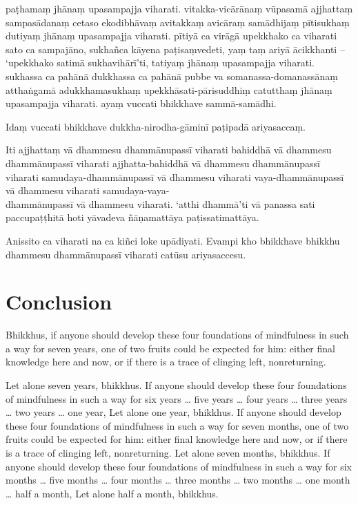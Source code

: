 
\paliPage

paṭhamaṃ jhānaṃ upasampajja viharati. vitakka-vicārānaṃ vūpasamā ajjhattaṃ
sampasādanaṃ cetaso ekodibhāvaṃ avitakkaṃ avicāraṃ samādhijaṃ pītisukhaṃ dutiyaṃ
jhānaṃ upasampajja viharati. pītiyā ca virāgā upekkhako ca viharati sato ca
sampajāno, sukhañca kāyena paṭisaṃvedeti, yaṃ taṃ ariyā ācikkhanti -- ‘upekkhako
satimā sukhavihārī’ti, tatiyaṃ jhānaṃ upasampajja viharati. sukhassa ca pahānā
dukkhassa ca pahānā pubbe va somanassa-domanassānaṃ atthaṅgamā adukkhamasukhaṃ
upekkhāsati-pārisuddhiṃ catutthaṃ jhānaṃ upasampajja viharati. ayaṃ vuccati
bhikkhave sammā-samādhi.

Idaṃ vuccati bhikkhave dukkha-nirodha-gāminī paṭipadā ariyasaccaṃ.

Iti ajjhattaṃ vā dhammesu dhammānupassī viharati bahiddhā vā dhammesu
dhammānupassī viharati ajjhatta-bahiddhā vā dhammesu dhammānupassī viharati
samudaya-dhammānupassī vā dhammesu viharati vaya-dhammānupassī vā dhammesu
viharati samudaya-vaya-\\
dhammānupassī vā dhammesu viharati. `atthi dhammā'ti vā
panassa sati paccupaṭṭhitā hoti yāvadeva ñāṇamattāya paṭissatimattāya.

Anissito ca viharati na ca kiñci loke upādiyati. Evampi kho bhikkhave bhikkhu
dhammesu dhammānupassī viharati catūsu ariyasaccesu.



\englishPage
\chapter{Conclusion}

Bhikkhus, if anyone should develop these four foundations of mindfulness in
such a way for seven years, one of two fruits could be expected for him: either
final knowledge here and now, or if there is a trace of clinging left,
nonreturning.

Let alone seven years, bhikkhus. If anyone should develop these four
foundations of mindfulness in such a way for six years \ldots{} five years
\ldots{} four years \ldots{} three years \ldots{} two years \ldots{} one year,
Let alone one year, bhikkhus. If anyone should develop these four foundations
of mindfulness in such a way for seven months, one of two fruits could be
expected for him: either final knowledge here and now, or if there is a trace of
clinging left, nonreturning. Let alone seven months, bhikkhus. If anyone should
develop these four foundations of mindfulness in such a way for six months
\ldots{} five months \ldots{} four months \ldots{} three months \ldots{} two
months \ldots{} one month \ldots{} half a month, Let alone half a month,
bhikkhus.

